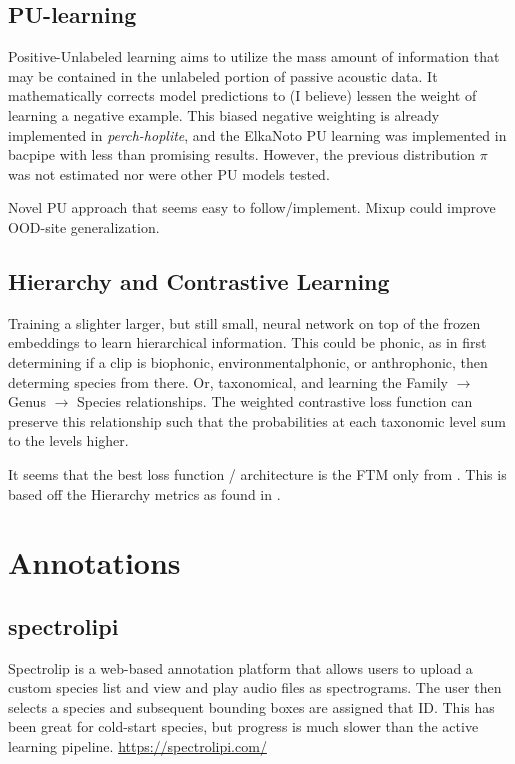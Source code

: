 \documentclass{article}
\begin{document}
\subsection{PU-learning}
Positive-Unlabeled learning aims to utilize the mass amount of information that may be contained in the unlabeled portion of passive acoustic data. It mathematically corrects model predictions to (I believe) lessen the weight of learning a negative example. This biased negative weighting is already implemented in \textit{perch-hoplite}, and the ElkaNoto PU learning was implemented in bacpipe with less than promising results. However, the previous distribution $\pi$ was not estimated nor were other PU models tested. 

\cite{zhangMixupEmpiricalRisk2018, chenVariationalApproachLearning2020, yuanPositiveLabelAll2024} Novel PU approach that seems easy to follow/implement. Mixup could improve OOD-site generalization. 
\subsection{Hierarchy and Contrastive Learning}
Training a slighter larger, but still small, neural network on top of the frozen embeddings to learn hierarchical information. This could be phonic, as in first determining if a clip is biophonic, environmentalphonic, or anthrophonic, then determing species from there. Or, taxonomical, and learning the Family $\rightarrow$ Genus $\rightarrow$ Species relationships. The weighted contrastive loss function can preserve this relationship such that the probabilities at each taxonomic level sum to the levels higher.  

It seems that the best loss function / architecture is the FTM only from \cite{kuHierarchyAwareRepresentationLearning}. This is based off the Hierarchy metrics as found in \cite{kiritchenkoLearningEvaluationPresence2006}. 
\section{Annotations}
\subsection{spectrolipi}
Spectrolip is a web-based annotation platform that allows users to upload a custom species list and view and play audio files as spectrograms. The user then selects a species and subsequent bounding boxes are assigned that ID. This has been great for cold-start species, but progress is much slower than the active learning pipeline. 
\url{https://spectrolipi.com/}
\end{document}
